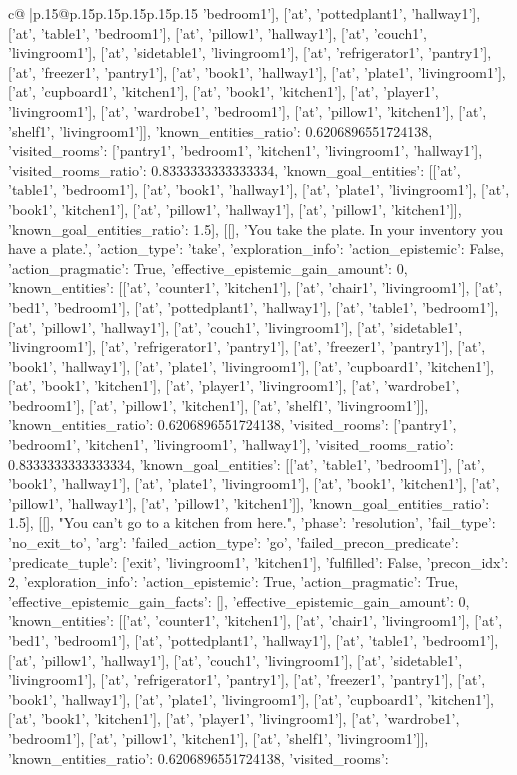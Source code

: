 \documentclass{article}
\begin{document}
{\begin{supertabular}{c@{$\;$}|p{.15\linewidth}@{}p{.15\linewidth}p{.15\linewidth}p{.15\linewidth}p{.15\linewidth}p{.15\linewidth}}
{{{'bedroom1'], ['at', 'pottedplant1', 'hallway1'], ['at', 'table1', 'bedroom1'], ['at', 'pillow1', 'hallway1'], ['at', 'couch1', 'livingroom1'], ['at', 'sidetable1', 'livingroom1'], ['at', 'refrigerator1', 'pantry1'], ['at', 'freezer1', 'pantry1'], ['at', 'book1', 'hallway1'], ['at', 'plate1', 'livingroom1'], ['at', 'cupboard1', 'kitchen1'], ['at', 'book1', 'kitchen1'], ['at', 'player1', 'livingroom1'], ['at', 'wardrobe1', 'bedroom1'], ['at', 'pillow1', 'kitchen1'], ['at', 'shelf1', 'livingroom1']], 'known_entities_ratio': 0.6206896551724138, 'visited_rooms': ['pantry1', 'bedroom1', 'kitchen1', 'livingroom1', 'hallway1'], 'visited_rooms_ratio': 0.8333333333333334, 'known_goal_entities': [['at', 'table1', 'bedroom1'], ['at', 'book1', 'hallway1'], ['at', 'plate1', 'livingroom1'], ['at', 'book1', 'kitchen1'], ['at', 'pillow1', 'hallway1'], ['at', 'pillow1', 'kitchen1']], 'known_goal_entities_ratio': 1.5}}], [[], 'You take the plate. In your inventory you have a plate.', {'action_type': 'take', 'exploration_info': {'action_epistemic': False, 'action_pragmatic': True, 'effective_epistemic_gain_amount': 0, 'known_entities': [['at', 'counter1', 'kitchen1'], ['at', 'chair1', 'livingroom1'], ['at', 'bed1', 'bedroom1'], ['at', 'pottedplant1', 'hallway1'], ['at', 'table1', 'bedroom1'], ['at', 'pillow1', 'hallway1'], ['at', 'couch1', 'livingroom1'], ['at', 'sidetable1', 'livingroom1'], ['at', 'refrigerator1', 'pantry1'], ['at', 'freezer1', 'pantry1'], ['at', 'book1', 'hallway1'], ['at', 'plate1', 'livingroom1'], ['at', 'cupboard1', 'kitchen1'], ['at', 'book1', 'kitchen1'], ['at', 'player1', 'livingroom1'], ['at', 'wardrobe1', 'bedroom1'], ['at', 'pillow1', 'kitchen1'], ['at', 'shelf1', 'livingroom1']], 'known_entities_ratio': 0.6206896551724138, 'visited_rooms': ['pantry1', 'bedroom1', 'kitchen1', 'livingroom1', 'hallway1'], 'visited_rooms_ratio': 0.8333333333333334, 'known_goal_entities': [['at', 'table1', 'bedroom1'], ['at', 'book1', 'hallway1'], ['at', 'plate1', 'livingroom1'], ['at', 'book1', 'kitchen1'], ['at', 'pillow1', 'hallway1'], ['at', 'pillow1', 'kitchen1']], 'known_goal_entities_ratio': 1.5}}], [[], "You can't go to a kitchen from here.", {'phase': 'resolution', 'fail_type': 'no_exit_to', 'arg': {'failed_action_type': 'go', 'failed_precon_predicate': {'predicate_tuple': ['exit', 'livingroom1', 'kitchen1'], 'fulfilled': False, 'precon_idx': 2}}, 'exploration_info': {'action_epistemic': True, 'action_pragmatic': True, 'effective_epistemic_gain_facts': [], 'effective_epistemic_gain_amount': 0, 'known_entities': [['at', 'counter1', 'kitchen1'], ['at', 'chair1', 'livingroom1'], ['at', 'bed1', 'bedroom1'], ['at', 'pottedplant1', 'hallway1'], ['at', 'table1', 'bedroom1'], ['at', 'pillow1', 'hallway1'], ['at', 'couch1', 'livingroom1'], ['at', 'sidetable1', 'livingroom1'], ['at', 'refrigerator1', 'pantry1'], ['at', 'freezer1', 'pantry1'], ['at', 'book1', 'hallway1'], ['at', 'plate1', 'livingroom1'], ['at', 'cupboard1', 'kitchen1'], ['at', 'book1', 'kitchen1'], ['at', 'player1', 'livingroom1'], ['at', 'wardrobe1', 'bedroom1'], ['at', 'pillow1', 'kitchen1'], ['at', 'shelf1', 'livingroom1']], 'known_entities_ratio': 0.6206896551724138, 'visited_rooms': }}}
\end{supertabular}}
\end{document}
